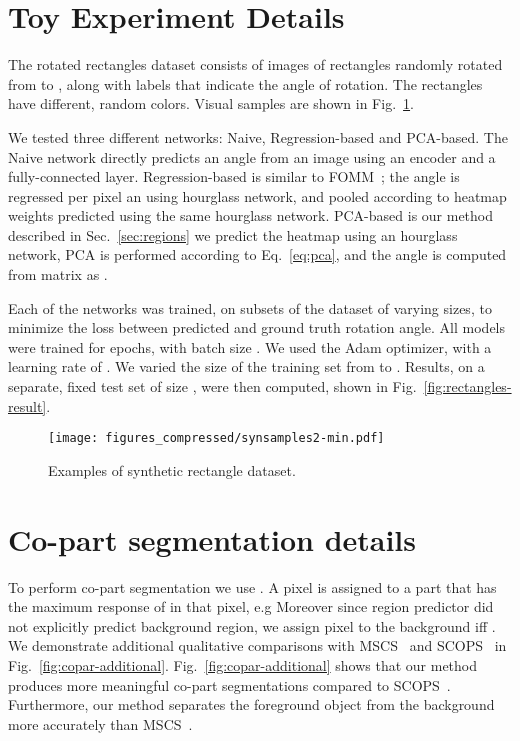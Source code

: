 \documentclass[final]{cvpr}
\begin{document}
\section{Toy Experiment Details}
\label{sec:motivation}
The rotated rectangles dataset consists of images of rectangles randomly rotated from  to , along with labels that indicate the angle of rotation. The rectangles have different, random colors. Visual samples are shown in Fig.~\ref{fig:rectangles}.

We tested three different networks: Naive, Regression-based and PCA-based. The Naive network directly predicts an angle from an image using an encoder and a fully-connected layer. Regression-based is similar to FOMM~\cite{fomm}; the angle is regressed per pixel an using hourglass network, and pooled according to heatmap weights predicted using the same hourglass network. PCA-based is our method described in Sec.~\ref{sec:regions} we predict the heatmap using an hourglass network, PCA is performed according to Eq.~\eqref{eq:pca}, and the angle is computed from matrix  as .

Each of the networks was trained, on subsets of the dataset of varying sizes, to minimize the  loss between predicted and ground truth rotation angle. All models were trained for  epochs, with batch size . We used the Adam optimizer, with a learning rate of . We varied the size of the training set from  to . Results, on a separate, fixed test set of size , were then computed, shown in Fig.~\ref{fig:rectangles-result}.
\begin{figure}[h]
    \centering
    \texttt{[image: figures\_compressed/synsamples2-min.pdf]}
    \caption{Examples of synthetic rectangle dataset.}
    \label{fig:rectangles}
\end{figure}


\section{Co-part segmentation details}
\label{sec:copart}

To perform co-part segmentation we use . 
A pixel  is assigned to a part that has the maximum response of   in that pixel, e.g 
Moreover since region predictor did not explicitly predict background region, we assign pixel  to the background iff . 
We demonstrate additional qualitative comparisons with MSCS~\cite{siarohin2020motionsupervised} and SCOPS~\cite{Hung_2019_CVPR} in Fig.~\ref{fig:copar-additional}. Fig.~\ref{fig:copar-additional} shows that our method produces more meaningful co-part segmentations compared to SCOPS~\cite{Hung_2019_CVPR}. Furthermore, our method separates the foreground object from the background more accurately than MSCS~\cite{siarohin2020motionsupervised}.
\end{document}

